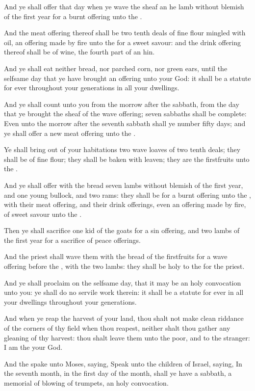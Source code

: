 \verse And ye shall offer that day when ye wave the sheaf an he lamb without blemish of the first year for a burnt offering unto the \LORD.

\verse And the meat offering thereof shall be two tenth deals of fine flour mingled with oil, an offering made by fire unto the \LORD for a sweet savour: and the drink offering thereof shall be of wine, the fourth part of an hin.

\verse And ye shall eat neither bread, nor parched corn, nor green ears, until the selfsame day that ye have brought an offering unto your God: it shall be a statute for ever throughout your generations in all your dwellings.

\verse And ye shall count unto you from the morrow after the sabbath, from the day that ye brought the sheaf of the wave offering; seven sabbaths shall be complete: \verse Even unto the morrow after the seventh sabbath shall ye number fifty days; and ye shall offer a new meat offering unto the \LORD.

\verse Ye shall bring out of your habitations two wave loaves of two tenth deals; they shall be of fine flour; they shall be baken with leaven; they are the firstfruits unto the \LORD.

\verse And ye shall offer with the bread seven lambs without blemish of the first year, and one young bullock, and two rams: they shall be for a burnt offering unto the \LORD, with their meat offering, and their drink offerings, even an offering made by fire, of sweet savour unto the \LORD.

\verse Then ye shall sacrifice one kid of the goats for a sin offering, and two lambs of the first year for a sacrifice of peace offerings.

\verse And the priest shall wave them with the bread of the firstfruits for a wave offering before the \LORD, with the two lambs: they shall be holy to the \LORD for the priest.

\verse And ye shall proclaim on the selfsame day, that it may be an holy convocation unto you: ye shall do no servile work therein: it shall be a statute for ever in all your dwellings throughout your generations.

\verse And when ye reap the harvest of your land, thou shalt not make clean riddance of the corners of thy field when thou reapest, neither shalt thou gather any gleaning of thy harvest: thou shalt leave them unto the poor, and to the stranger: I am the \LORD your God.

\verse And the \LORD spake unto Moses, saying, \verse Speak unto the children of Israel, saying, In the seventh month, in the first day of the month, shall ye have a sabbath, a memorial of blowing of trumpets, an holy convocation.

